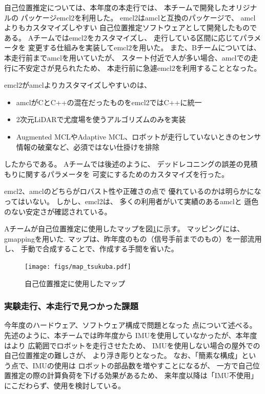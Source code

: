 \documentclass[twocolumn,9pt]{jsproceedings}
\begin{document}
自己位置推定については、本年度の本走行では、
本チームで開発したオリジナルの
パッケージemcl2\cite{emcl2}を利用した。
emcl2はamcl\cite{amcl}と互換のパッケージで、
amclよりもカスタマイズしやすい
自己位置推定ソフトウェアとして開発したものである。
Aチームではemcl2をカスタマイズし、
走行している区間に応じてパラメータを
変更する仕組みを実装してemcl2を用いた。
また、Bチームについては、本走行前までamclを用いていたが、
スタート付近で人が多い場合、amclでの走行に不安定さが見られたため、
本走行前に急遽emcl2を利用することとなった。


emcl2がamclよりカスタマイズしやすいのは、
\begin{itemize}
	\item amclがCとC++の混在だったものをemcl2ではC++に統一
	\item 2次元LiDARで尤度場を使うアルゴリズムのみを実装
	\item Augmented MCL\cite{gutmann2002}やAdaptive MCL\cite{fox2003}、ロボットが走行していないときのセンサ情報の破棄など、必須ではない仕掛けを排除
\end{itemize}
したからである。
Aチームでは後述のように、
デッドレコニングの誤差の見積もりに関するパラメータを
可変にするためのカスタマイズを行った。

emcl2、amclのどちらがロバスト性や正確さの点で
優れているのかは明らかになってはいない。
しかし、emcl2は、
多くの利用者がいて実績のあるamclと
遜色のない安定さが確認されている。



Aチームが自己位置推定に使用したマップを図\ref{fig:map_tsukuba}に示す。
マッピングには、gmapping\cite{gmapping}を用いた. 
マップは、昨年度のもの（信号手前までのもの）を一部流用し、
手動で合成することで、作成する手間を省いた。



\begin{figure}[h]
  \begin{center}
    \texttt{[image: figs/map\_tsukuba.pdf]}
    \caption{自己位置推定に使用したマップ}
    \label{fig:map_tsukuba}
  \end{center}
\end{figure}

\subsubsection{実験走行、本走行で見つかった課題}

今年度のハードウェア、ソフトウェア構成で問題となった
点について述べる。先述のように、本チームでは昨年度から
IMUを使用していなかったが、本年度はより
広範囲でロボットを走行させたため、
IMUを使用しない場合の屋外での自己位置推定の難しさが、
より浮き彫りとなった。
なお、「簡素な構成」という点で、IMUの使用は
ロボットの部品数を増やすことになるが、
一方で自己位置推定の際の計算負荷を下げる効果があるため、
来年度以降は「IMU不使用」にこだわらず、使用を検討している。
\end{document}
